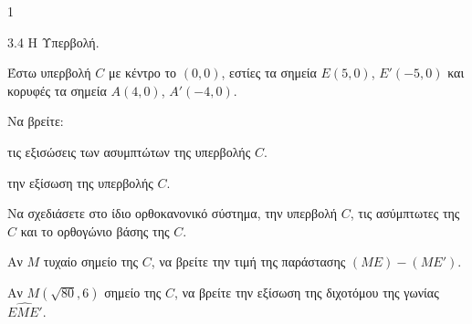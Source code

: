 \begin{ylh}{1}
    \item 3.4 Η Υπερβολή.
\end{ylh}
Έστω υπερβολή $C$ με κέντρο το $(0,0)$, εστίες τα σημεία $E(5,0)$, $E'(-5,0)$ και κορυφές τα σημεία $A(4,0)$, $A'(-4,0)$.
\begin{alist}
\item Να βρείτε:
    \begin{rlist}
    \item τις εξισώσεις των ασυμπτώτων της υπερβολής $C$. 
    \item την εξίσωση της υπερβολής $C$. 
    \end{rlist}
\item Να σχεδιάσετε στο ίδιο ορθοκανονικό σύστημα, την υπερβολή $C$, τις ασύμπτωτες της $C$ και το ορθογώνιο βάσης της $C$. 
\item Αν $M$ τυχαίο σημείο της $C$, να βρείτε την τιμή της παράστασης $(ME)-(ME')$. 
\item Αν $M(\sqrt{80},6)$ σημείο της $C$, να βρείτε την εξίσωση της διχοτόμου της γωνίας $\widehat{EME'}$. 
\end{alist}